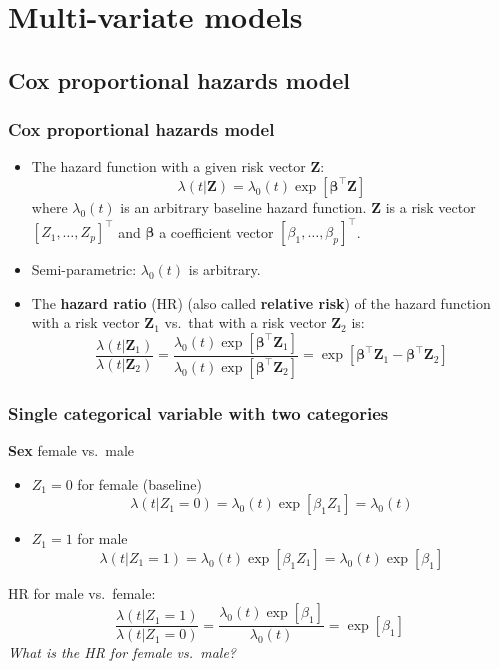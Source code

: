 \documentclass[11pt, aspectratio = 169]{beamer}
\begin{document}
\section{Multi-variate models}
\subsection{Cox proportional hazards model}

\begin{frame}
  \frametitle{Cox proportional hazards model}
  \begin{itemize}
    \item The hazard function with a given risk vector $\mathbf{Z}$:
    \begin{equation*}
      \lambda(t|\mathbf{Z}) = \lambda_0(t)\exp\left[\boldsymbol{\beta}^\top\mathbf{Z}\right]
    \end{equation*}
    where $\lambda_0(t)$ is an arbitrary baseline hazard function. $\mathbf{Z}$ is a risk vector $\left[Z_1,\dotsc,Z_p\right]^\top$ and $\boldsymbol{\beta}$ a coefficient vector $\left[\beta_1,\dotsc,\beta_p\right]^\top$.
    \item Semi-parametric: $\lambda_0(t)$ is arbitrary.
    \item The \textbf{hazard ratio} (HR) (also called \textbf{relative risk}) of the hazard function with a risk vector $\mathbf{Z}_1$ vs.\ that with a risk vector $\mathbf{Z}_2$ is:
    \begin{equation*}
      \frac{\lambda\left(t|\mathbf{Z}_1\right)}{\lambda\left(t|\mathbf{Z}_2\right)} = \frac{\lambda_0(t)\exp\left[\boldsymbol{\beta}^\top\mathbf{Z}_1\right]}{\lambda_0(t)\exp\left[\boldsymbol{\beta}^\top\mathbf{Z}_2\right]} = \exp\left[\boldsymbol{\beta}^\top\mathbf{Z}_1 - \boldsymbol{\beta}^\top\mathbf{Z}_2\right]
    \end{equation*}
  \end{itemize}
\end{frame}

\begin{frame}
  \frametitle{Single categorical variable with two categories}
  \textbf{Sex} female vs.\ male
  \begin{itemize}
    \item $Z_1 = 0$ for female (baseline)
    \begin{equation*}
      \lambda(t|Z_1 = 0) = \lambda_0(t)\exp\left[\beta_1Z_1\right] = \lambda_0(t)
    \end{equation*}
    \item $Z_1 = 1$ for male
    \begin{equation*}
      \lambda(t|Z_1 = 1) = \lambda_0(t)\exp\left[\beta_1Z_1\right] = \lambda_0(t)\exp\left[\beta_1\right]
    \end{equation*}
  \end{itemize}
  HR for male vs.\ female:
  \begin{equation*}
    \frac{\lambda(t|Z_1 = 1)}{\lambda(t|Z_1 = 0)} = \frac{\lambda_0(t)\exp\left[\beta_1\right]}{\lambda_0(t)} = \exp\left[\beta_1\right]
  \end{equation*}
  \textit{What is the HR for female vs.\ male?}
\end{frame}
\end{document}
